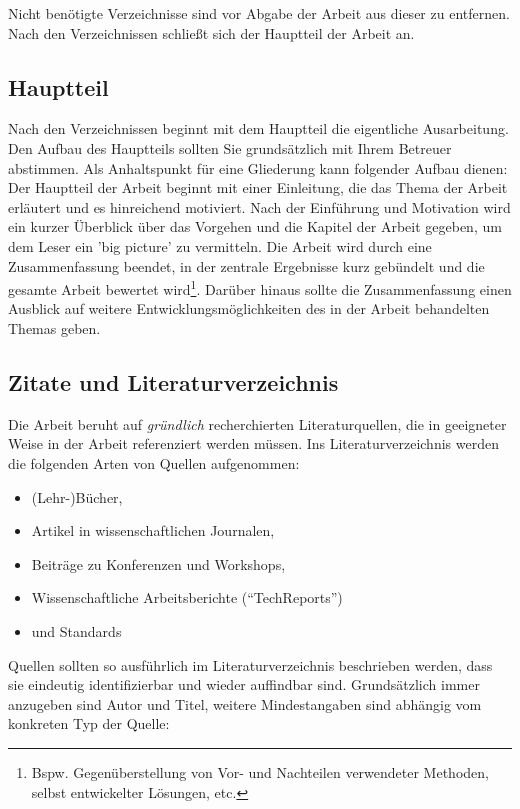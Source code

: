 Nicht benötigte Verzeichnisse sind vor Abgabe der Arbeit aus dieser zu entfernen. Nach
den Verzeichnissen schließt sich der Hauptteil der Arbeit an.

\subsection{Hauptteil}
Nach den Verzeichnissen beginnt mit dem Hauptteil die eigentliche Ausarbeitung. 
Den Aufbau des Hauptteils sollten Sie grundsätzlich mit Ihrem Betreuer abstimmen. Als Anhaltspunkt für eine Gliederung kann folgender Aufbau dienen:\\
Der Hauptteil der Arbeit beginnt mit einer Einleitung, die das Thema der Arbeit erläutert
und es hinreichend motiviert. Nach der Einführung und Motivation wird ein kurzer
Überblick über das Vorgehen und die Kapitel der Arbeit gegeben, um dem Leser ein 'big
picture' zu vermitteln. Die Arbeit wird durch eine Zusammenfassung beendet, in der zentrale Ergebnisse kurz geb\"undelt und die gesamte Arbeit bewertet
wird\footnote{Bspw. Gegenüberstellung von Vor- und Nachteilen verwendeter Methoden, selbst entwickelter Lösungen,
etc.}. Darüber hinaus sollte die Zusammenfassung einen Ausblick auf weitere Entwicklungsmöglichkeiten des in der Arbeit behandelten Themas geben.

\subsection{Zitate und Literaturverzeichnis}

Die Arbeit beruht auf \textit{gründlich} recherchierten
Literaturquellen, die in geeigneter Weise in der Arbeit referenziert werden müssen.
Ins Literaturverzeichnis werden die folgenden Arten von Quellen aufgenommen:
\begin{itemize}
	\item (Lehr-)Bücher,
	\item Artikel in wissenschaftlichen Journalen,
	\item Beiträge zu Konferenzen und Workshops,
	\item Wissenschaftliche Arbeitsberichte ("`TechReports"')
	\item und Standards
\end{itemize}

Quellen sollten so ausführlich im Literaturverzeichnis beschrieben werden, dass sie eindeutig identifizierbar und wieder auffindbar sind. 
Grundsätzlich immer anzugeben sind Autor und Titel, weitere Mindestangaben sind abhängig vom konkreten Typ der Quelle: 

